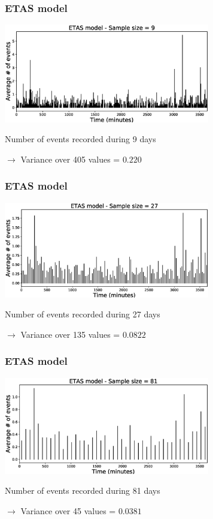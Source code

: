 \documentclass{beamer}
\begin{document}
	\begin{frame}
		\frametitle{ETAS model}
		\begin{center}
			\includegraphics[width=9cm, trim={1cm 0cm 3cm 0cm}, clip]{longrange/ETAS_3.eps}
		\end{center}
		Number of events recorded during 9 days

		$\rightarrow$ Variance over 405 values = $0.220$
	\end{frame}

	\begin{frame}
		\frametitle{ETAS model}
		\begin{center}
			\includegraphics[width=9cm, trim={1cm 0cm 3cm 0cm}, clip]{longrange/ETAS_4.eps}
		\end{center}
		Number of events recorded during 27 days

		$\rightarrow$ Variance over 135 values = $0.0822$
	\end{frame}

	\begin{frame}
		\frametitle{ETAS model}
		\begin{center}
			\includegraphics[width=9cm, trim={1cm 0cm 3cm 0cm}, clip]{longrange/ETAS_5.eps}
		\end{center}
		Number of events recorded during 81 days

		$\rightarrow$ Variance over 45 values = $0.0381$
	\end{frame}
\end{document}
